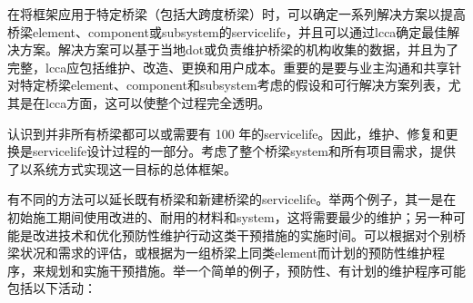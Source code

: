 在将框架应用于特定桥梁（包括大跨度桥梁）时，可以确定一系列解决方案以提高桥梁\gls*{element}、\gls*{component}或\gls*{subsystem}的\gls*{servicelife}，并且可以通过\acrlong*{lcca}确定最佳解决方案。解决方案可以基于当地\acrlong*{dot}或负责维护桥梁的机构收集的数据，并且为了完整，\acrlong*{lcca}应包括维护、改造、更换和用户成本。重要的是要与业主沟通和共享针对特定桥梁\gls*{element}、\gls*{component}和\gls*{subsystem}考虑的假设和可行解决方案列表，尤其是在\acrlong*{lcca}方面，这可以使整个过程完全透明。

认识到并非所有桥梁都可以或需要有 100 年的\gls*{servicelife}。因此，维护、修复和更换是\gls*{servicelife}设计过程的一部分。考虑了整个桥梁\gls*{system}和所有项目需求，提供了以系统方式实现这一目标的总体框架。

有不同的方法可以延长既有桥梁和新建桥梁的\gls{servicelife}。举两个例子，其一是在初始施工期间使用改进的、耐用的材料和\gls*{system}，这将需要最少的维护；另一种可能是改进技术和优化预防性维护行动这类干预措施的实施时间。可以根据对个别桥梁状况和需求的评估，或根据为一组桥梁上同类\gls{element}而计划的预防性维护程序，来规划和实施干预措施。举一个简单的例子，预防性、有计划的维护程序可能包括以下活动：

